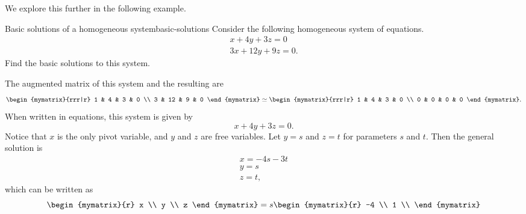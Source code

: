We explore this further in the following example.

\begin{example}{Basic solutions of a homogeneous system}{basic-solutions}
  Consider the following homogeneous system of equations.
  \begin{equation}\label{eqn:basic-solutions-1}
    \begin{array}{c}
      x + 4y + 3z = 0 \\
      3x + 12y + 9z = 0.
    \end{array}
  \end{equation}
  Find the basic solutions to this system.
\end{example}

\begin{solution}
  The augmented matrix of this system and the resulting {\rref} are
  \begin{equation*}
    \begin{mymatrix}{rrr|r}
      1 & 4 & 3 & 0 \\
      3 & 12 & 9 & 0
    \end{mymatrix}
    \roweq
    \begin{mymatrix}{rrr|r}
      1 & 4 & 3 & 0 \\
      0 & 0 & 0 & 0
    \end{mymatrix}.
  \end{equation*}
  When written in equations, this system is given by
  \begin{equation*}
    x + 4y + 3z = 0.
  \end{equation*}
  Notice that $x$ is the only pivot variable, and $y$ and $z$ are free
  variables. Let $y = s$ and $z=t$ for parameters $s$ and $t$. Then the
  general solution is
  \begin{equation*}
    \begin{array}{c}
      x = -4s - 3t \\
      y = s \\
      z = t,
    \end{array}
  \end{equation*}
  which can be written as
  \begin{equation*}
    \begin{mymatrix}{r}
      x \\
      y \\
      z
    \end{mymatrix}
    =
    s
    \begin{mymatrix}{r}
      -4 \\
      1 \\

\end{mymatrix}
\end{equation*}
\end{solution}
